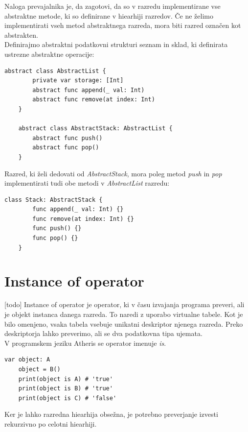 \documentclass[a4paper, 12p]{book}
\begin{document}
Naloga prevajalnika je, da zagotovi, da so v razredu implementirane vse abstraktne metode, ki so definirane v hiearhiji razredov. Če ne želimo implementirati vseh metod abstraktnega razreda, mora biti razred označen kot abstrakten. \\
\indent Definirajmo abstraktni podatkovni strukturi seznam in sklad, ki definirata ustrezne abstraktne operacije:

\begin{lstlisting}[caption={}, captionpos=b]
	abstract class AbstractList {
	    private var storage: [Int]
	    abstract func append(_ val: Int)
	    abstract func remove(at index: Int)
	}
	
	abstract class AbstractStack: AbstractList {
	    abstract func push()
	    abstract func pop()
	}
\end{lstlisting}

Razred, ki želi dedovati od \textit{AbstractStack}, mora poleg metod \textit{push} in \textit{pop} implementirati tudi obe metodi v \textit{AbstractList} razredu:

\begin{lstlisting}[caption={Implementacija abstraktne podaktovne strukture.}, captionpos=b]
	class Stack: AbstractStack {
	    func append(_ val: Int) {}
	    func remove(at index: Int) {}
	    func push() {}
	    func pop() {}
	}
\end{lstlisting}

\section{Instance of operator}

[todo]
Instance of operator je operator, ki v času izvajanja programa preveri, ali je objekt instanca danega razreda. To naredi z uporabo virtualne tabele. Kot je bilo omenjeno, vsaka tabela vsebuje unikatni deskriptor njenega razreda. Preko deskriptorja lahko preverimo, ali se dva podatkovna tipa ujemata. \\
\indent V programskem jeziku Atheris se operator imenuje \textit{is}.

\begin{lstlisting}[caption={Uporaba operatorja \textit{is} za razrede iz sheme ~\ref{vtables}.}, captionpos=b]
	var object: A
	object = B()
	print(object is A) # 'true'
	print(object is B) # 'true'
	print(object is C) # 'false'
\end{lstlisting}

Ker je lahko razredna hiearhija obsežna, je potrebno preverjanje izvesti rekurzivno po celotni hiearhiji.
\end{document}
